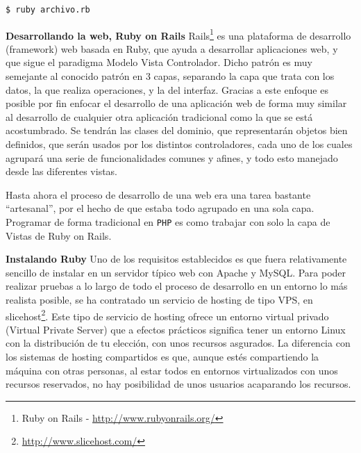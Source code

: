 \begin{verbatim}
$ ruby archivo.rb
\end{verbatim}

\textbf{Desarrollando la web, Ruby on Rails}
Rails\footnote{Ruby on Rails - \url{http://www.rubyonrails.org/}} es una plataforma de desarrollo (framework) web basada en Ruby, que ayuda a desarrollar aplicaciones web, y que sigue el paradigma Modelo Vista Controlador. Dicho patrón es muy semejante al conocido patrón en 3 capas, separando la capa que trata con los datos, la que realiza operaciones, y la del interfaz. Gracias a este enfoque es posible por fin enfocar el desarrollo de una aplicación web de forma muy similar al desarrollo de cualquier otra aplicación tradicional como la que se está acostumbrado. Se tendrán las clases del dominio, que representarán objetos bien definidos, que serán usados por los distintos controladores, cada uno de los cuales agrupará una serie de funcionalidades comunes y afines, y todo esto manejado desde las diferentes vistas.

Hasta ahora el proceso de desarrollo de una web era una tarea bastante ``artesanal'', por el hecho de que estaba todo agrupado en una sola capa. Programar de forma tradicional en \texttt{PHP} es como trabajar con solo la capa de Vistas de Ruby on Rails. 

\textbf{Instalando Ruby}
Uno de los requisitos establecidos es que fuera relativamente sencillo de instalar en un servidor típico web con Apache y MySQL. Para poder realizar pruebas a lo largo de todo el proceso de desarrollo en un entorno lo más realista posible, se ha contratado un servicio de hosting de tipo VPS, en slicehost\footnote{\url{http://www.slicehost.com/}}. Este tipo de servicio de hosting ofrece un entorno virtual privado (Virtual Private Server) que a efectos prácticos significa tener un entorno Linux con la distribución de tu elección, con unos recursos asgurados. La diferencia con los sistemas de hosting compartidos es que, aunque estés compartiendo la máquina con otras personas, al estar todos en entornos virtualizados con unos recursos reservados, no hay posibilidad de unos usuarios acaparando los recursos.

